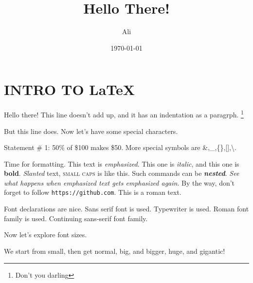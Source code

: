 \documentclass[a4paper, 11pt]{article}
\begin{document}
    \title{Hello There!}
    \author{Ali}
    \date{\today}
    \maketitle      %

    \section{INTRO TO \LaTeX}

    Hello there!
    This line doesn't add up, and it has an indentation as a paragrph. \footnote{Don't you darling}

    But this line does. Now let's have some special characters.

    Statement \# 1:
    50\% of \$100 makes \$50.
    More special symbols are \&,\_,\{\},[],\textbackslash.

    Time for formatting.
    This text is \emph{emphasized}.
    This one is \textit{italic}, and this one is \textbf{bold}.
    \textsl{Slanted} text, \textsc{small caps} is like this.
    Such commands can be \textit{\textbf{nested}}.
    \emph{See what happens when \emph{emphasized} text gets \emph{emphasized again}}. %
    By the way, don't forget to follow \texttt{https://github.com}.
    This is a \textrm{roman} text.

    Font declarations are nice. \sffamily
    Sans serif font is used. \ttfamily
    Typewriter is used. \rmfamily
    Roman font family is used. \sffamily
    Continuing sans-serif font family.

    \noindent
    Now let's explore font sizes.

    \noindent\tiny We \scriptsize start \footnotesize from \small small, \normalsize then get normal, \large big, and \LARGE bigger, \huge huge, and \Huge gigantic!
    \normalsize
\end{document}
